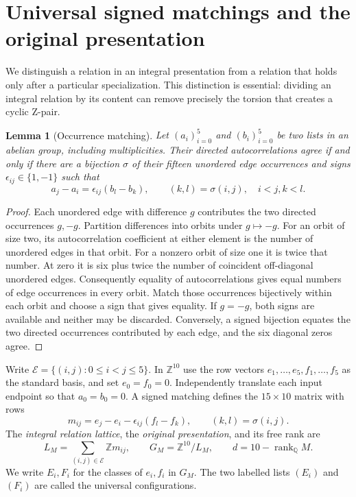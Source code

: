 \documentclass[11pt]{article}
\newtheorem{lemma}[theorem]{Lemma}
\theoremstyle{remark}
\newcommand{\Z}{\mathbb Z}
\newcommand{\rank}{\operatorname{rank}}
\begin{document}
\section{Universal signed matchings and the original presentation}
\label{sec:universal}

We distinguish a relation in an integral presentation from a relation that
holds only after a particular specialization. This distinction is essential:
dividing an integral relation by its content can remove precisely the torsion
that creates a cyclic Z-pair.

\begin{lemma}[Occurrence matching]\label{lem:occurrence-matching}
Let $(a_i)_{i=0}^5$ and $(b_i)_{i=0}^5$ be two lists in an abelian group,
including multiplicities. Their directed autocorrelations agree if and only
if there are a bijection $\sigma$ of their fifteen unordered edge
occurrences and signs $\epsilon_{ij}\in\{1,-1\}$ such that
\[
 a_j-a_i=\epsilon_{ij}(b_l-b_k),\qquad
 (k,l)=\sigma(i,j),\quad i<j, k<l.
\]
\end{lemma}
\begin{proof}
Each unordered edge with difference $g$ contributes the two directed
occurrences $g,-g$. Partition differences into orbits under $g\mapsto-g$.
For an orbit of size two, its autocorrelation coefficient at either element
is the number of unordered edges in that orbit. For a nonzero orbit of size
one it is twice that number. At zero it is six plus twice the number of
coincident off-diagonal unordered edges. Consequently equality of
autocorrelations gives equal numbers of edge occurrences in every orbit.
Match those occurrences bijectively within each orbit and choose a sign
that gives equality. If $g=-g$, both signs are available and neither may be
discarded. Conversely, a signed bijection equates the two directed
occurrences contributed by each edge, and the six diagonal zeros agree.
\end{proof}

Write $\mathcal E=\{(i,j):0\le i<j\le5\}$. In $\Z^{10}$ use the row vectors
$e_1,\ldots,e_5,f_1,\ldots,f_5$ as the standard basis, and set
$e_0=f_0=0$. Independently translate each input endpoint so that
$a_0=b_0=0$. A signed matching defines the $15\times10$ matrix with rows
\begin{equation}\label{eq:formal-matching-row}
 m_{ij}=e_j-e_i-\epsilon_{ij}(f_l-f_k),\qquad(k,l)=\sigma(i,j).
\end{equation}
The \emph{integral relation lattice}, the \emph{original presentation},
and its free rank are
\begin{equation}\label{eq:original-presentation}
 L_M=\sum_{(i,j)\in\mathcal E}\Z m_{ij},\qquad
 G_M=\Z^{10}/L_M,\qquad d=10-\rank_{\mathbb Q}M.
\end{equation}
We write $E_i,F_i$ for the classes of $e_i,f_i$ in $G_M$. The two labelled
lists $(E_i)$ and $(F_i)$ are called the universal configurations.
\end{document}
